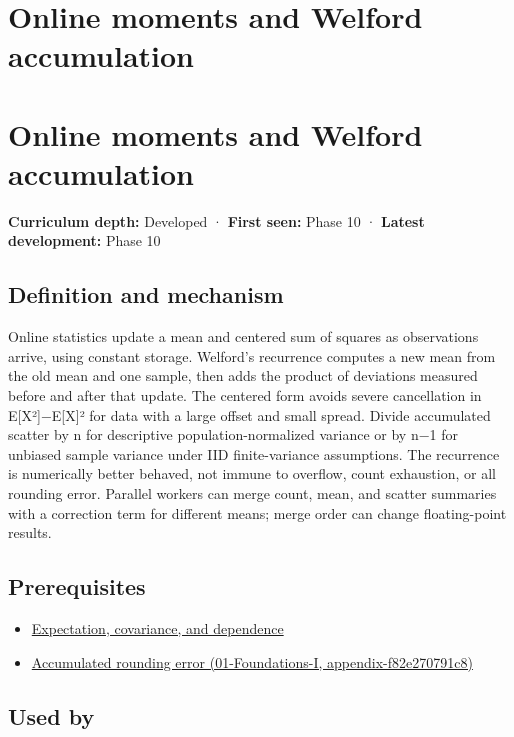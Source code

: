 \hypertarget{appendix-33237f0f618b}{}
\section*{Online moments and Welford accumulation}
\section{Online moments and Welford accumulation}\label{appendix-33237f0f618b-online-moments-and-welford-accumulation}

\textbf{Curriculum depth:} Developed · \textbf{First seen:} Phase 10 · \textbf{Latest development:} Phase 10

\subsection{Definition and mechanism}\label{appendix-33237f0f618b-definition-and-mechanism}

Online statistics update a mean and centered sum of squares as observations arrive, using constant storage. Welford's recurrence computes a new mean from the old mean and one sample, then adds the product of deviations measured before and after that update. The centered form avoids severe cancellation in E{[}X²{]}−E{[}X{]}² for data with a large offset and small spread. Divide accumulated scatter by n for descriptive population-normalized variance or by n−1 for unbiased sample variance under IID finite-variance assumptions. The recurrence is numerically better behaved, not immune to overflow, count exhaustion, or all rounding error. Parallel workers can merge count, mean, and scatter summaries with a correction term for different means; merge order can change floating-point results.

\subsection{Prerequisites}\label{appendix-33237f0f618b-prerequisites}

\begin{itemize}
\tightlist
\item
  \hyperref[appendix-54c383df9992]{Expectation, covariance, and dependence}
\item
  \href{../01-Foundations-I/main.pdf\#nameddest=appendix-f82e270791c8}{Accumulated rounding error (01-Foundations-I, appendix-f82e270791c8)}
\end{itemize}

\subsection{Used by}\label{appendix-33237f0f618b-used-by}

